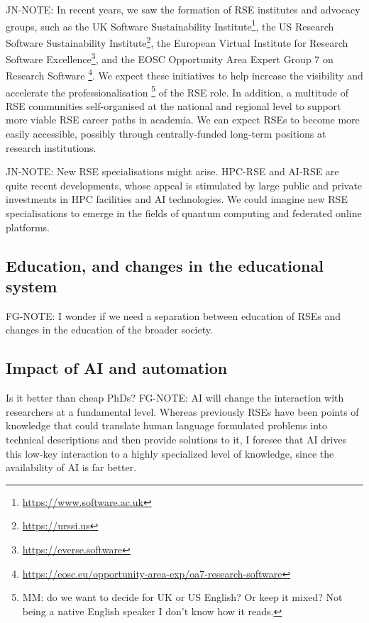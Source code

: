 \documentclass{eceasst}
\begin{document}
\begin{FramedParagraphWithFootnotes}
JN-NOTE:
In recent years, we saw the formation of RSE institutes and advocacy groups, such as
the UK Software Sustainability Institute\footnote{\url{https://www.software.ac.uk}},
the US Research Software Sustainability Institute\footnote{\url{https://urssi.us}},
the European Virtual Institute for Research Software Excellence\footnote{\url{https://everse.software}},
and the EOSC Opportunity Area Expert Group 7 on Research Software%
\footnote{\url{https://eosc.eu/opportunity-area-exp/oa7-research-software}}.
We expect these initiatives to help increase the visibility and accelerate
the professionalisation%
\footnote{MM: do we want to decide for UK or US English? Or keep it mixed? Not being a native English speaker I don't know how it reads.}
of the RSE role.
In addition, a multitude of RSE communities self-organised at the national
and regional level to support more viable RSE career paths in academia.
We can expect RSEs to become more easily accessible,
possibly through centrally-funded long-term positions at research institutions.
\end{FramedParagraphWithFootnotes}

\begin{FramedParagraphWithFootnotes}
JN-NOTE:
New RSE specialisations might arise.
HPC-RSE and AI-RSE are quite recent developments,
whose appeal is stimulated by large public and private
investments in HPC facilities and AI technologies.
We could imagine new RSE specialisations to emerge in the fields
of quantum computing and federated online platforms.
\end{FramedParagraphWithFootnotes}


\subsection{Education, and changes in the educational system}
FG-NOTE: I wonder if we need a separation between education of RSEs and changes in the education of the broader society.

\subsection{Impact of AI and automation}
Is it better than cheap PhDs?
FG-NOTE: AI will change the interaction with researchers at a fundamental level. Whereas previously RSEs have been points of knowledge that could translate human language formulated problems into technical descriptions and then provide solutions to it,
I foresee that AI drives this low-key interaction to a highly specialized level of knowledge, since the availability of AI is far better.
\end{document}
